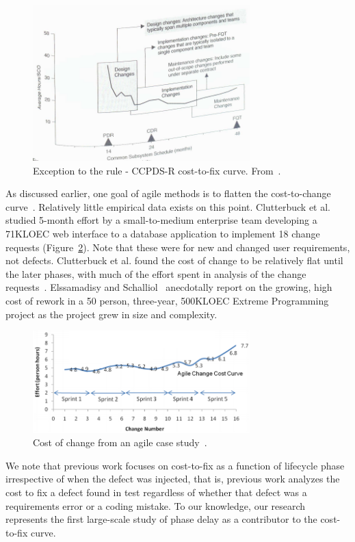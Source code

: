 \begin{figure}
 \includegraphics[width=3.3in]{Royce98.PNG}
 \caption{Exception to the rule - CCPDS-R cost-to-fix curve. From~\cite{Royce98}. }\label{fig:royce}
 \end{figure}
 
As discussed earlier, one goal of agile methods is to flatten the cost-to-change curve~\cite{beck00}. Relatively little empirical data exists on this point. Clutterbuck et al.~\cite{Clutterbuck09} studied 5-month effort by a small-to-medium enterprise team developing a 71KLOEC web interface to a database application to implement 18 change requests (Figure~\ref{fig:clutterbuck}). Note that these were for new and changed user requirements, not defects. Clutterbuck et al. found the cost of change to be relatively flat until the later phases, with much of the effort spent in analysis of the change requests~\cite{Clutterbuck09}. Elssamadisy and Schalliol~\cite{Elssamadisy02} anecdotally report on the growing, high cost of rework in a 50 person, three-year, 500KLOEC Extreme Programming project as the project grew in size and complexity.

\begin{figure}
 \includegraphics[width=3.3in]{clutterbuck.png}
 \caption{Cost of change from an agile case study~\cite{Clutterbuck09}.}\label{fig:clutterbuck}
 \end{figure}
 
 We note that previous work focuses on cost-to-fix as a function of lifecycle phase irrespective of when the defect was injected, that is, previous work analyzes the cost to fix a defect found in test regardless of whether that defect was a requirements error or a coding mistake. To our knowledge, our research represents the first large-scale study of phase delay as a contributor to the cost-to-fix curve.